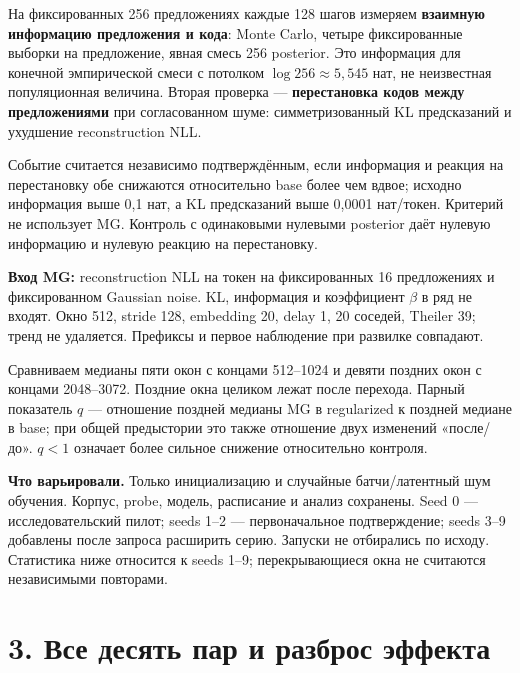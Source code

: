 \documentclass[10pt,a4paper]{article}
\begin{document}
На фиксированных 256 предложениях каждые 128 шагов измеряем \textbf{взаимную информацию предложения и кода}: Monte Carlo, четыре фиксированные выборки на предложение, явная смесь 256 posterior. Это информация для конечной эмпирической смеси с потолком $\log256\approx5{,}545$ нат, не неизвестная популяционная величина. Вторая проверка --- \textbf{перестановка кодов между предложениями} при согласованном шуме: симметризованный KL предсказаний и ухудшение reconstruction NLL.

Событие считается независимо подтверждённым, если информация и реакция на перестановку обе снижаются относительно base более чем вдвое; исходно информация выше 0,1 нат, а KL предсказаний выше 0,0001 нат/токен. Критерий не использует MG. Контроль с одинаковыми нулевыми posterior даёт нулевую информацию и нулевую реакцию на перестановку.

\textbf{Вход MG:} reconstruction NLL на токен на фиксированных 16 предложениях и фиксированном Gaussian noise. KL, информация и коэффициент $\beta$ в ряд не входят. Окно 512, stride 128, embedding 20, delay 1, 20 соседей, Theiler 39; тренд не удаляется. Префиксы и первое наблюдение при развилке совпадают.

Сравниваем медианы пяти окон с концами 512--1024 и девяти поздних окон с концами 2048--3072. Поздние окна целиком лежат после перехода. Парный показатель $q$ --- отношение поздней медианы MG в regularized к поздней медиане в base; при общей предыстории это также отношение двух изменений «после/до». $q<1$ означает более сильное снижение относительно контроля.

\textbf{Что варьировали.} Только инициализацию и случайные батчи/латентный шум обучения. Корпус, probe, модель, расписание и анализ сохранены. Seed 0 --- исследовательский пилот; seeds 1--2 --- первоначальное подтверждение; seeds 3--9 добавлены после запроса расширить серию. Запуски не отбирались по исходу. Статистика ниже относится к seeds 1--9; перекрывающиеся окна не считаются независимыми повторами.

\newpage

\section*{3. Все десять пар и разброс эффекта}
\end{document}
